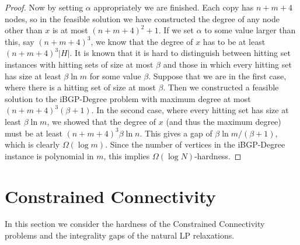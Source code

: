 \documentclass[11pt,letterpaper]{article}
\theoremstyle{definition}
\begin{document}
\begin{proof}
  Now by setting $\alpha$ appropriately we are finished.  Each copy
  has $n+m+4$ nodes, so in the feasible solution we have constructed
  the degree of any node other than $x$ is at most $(n+m+4)^2 + 1$.
  If we set $\alpha$ to some value larger than this, say $(n+m+4)^3$,
  we know that the degree of $x$ has to be at least $(n+m+4)^3 |H|$.
  It is known that it is hard to distinguish between hitting set
  instances with hitting sets of size at most $\beta$ and
  those in which every hitting set has size at least $\beta \ln m$ for
  some value $\beta$.  Suppose that we are in the first case, where
  there is a hitting set of size at most $\beta$.  Then we constructed
  a feasible solution to the {\sc iBGP-Degree} problem with maximum
  degree at most $(n+m+4)^3(\beta+1)$.  In the second case, where
  every hitting set has size at least $\beta \ln m$, we showed that
  the degree of $x$ (and thus the maximum degree) must be at least
  $(n+m+4)^3 \beta \ln n$.  This gives a gap of $\beta \ln m / (\beta
  + 1)$, which is clearly $\Omega(\log m)$.  Since the number of
  vertices in the {\sc iBGP-Degree} instance is polynomial in $m$,
  this implies $\Omega(\log N)$-hardness.
  \end{proof}





\section{Constrained Connectivity} \label{sec:CC}
In this section we consider the hardness of the Constrained Connectivity problems and the integrality gaps of the natural LP relaxations.
\end{document}
